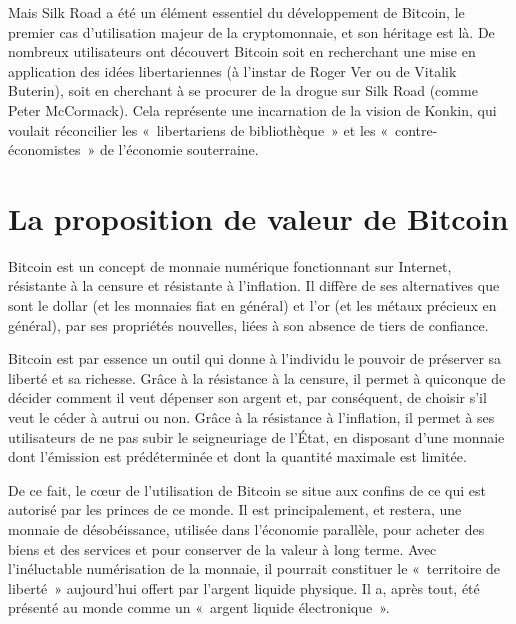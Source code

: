 Mais Silk Road a été un élément essentiel du développement de Bitcoin, le premier cas d'utilisation majeur de la cryptomonnaie, et son héritage est là. De nombreux utilisateurs ont découvert Bitcoin soit en recherchant une mise en application des idées libertariennes (à l'instar de Roger Ver ou de Vitalik Buterin), soit en cherchant à se procurer de la drogue sur Silk Road (comme Peter McCormack). Cela représente une incarnation de la vision de Konkin, qui voulait réconcilier les «~libertariens de bibliothèque~» et les «~contre-économistes~» de l'économie souterraine.

\section*{La proposition de valeur de Bitcoin}

Bitcoin est un concept de monnaie numérique fonctionnant sur Internet, résistante à la censure et résistante à l'inflation. Il diffère de ses alternatives que sont le dollar (et les monnaies fiat en général) et l'or (et les métaux précieux en général), par ses propriétés nouvelles, liées à son absence de tiers de confiance. 

Bitcoin est par essence un outil qui donne à l'individu le pouvoir de préserver sa liberté et sa richesse. Grâce à la résistance à la censure, il permet à quiconque de décider comment il veut dépenser son argent et, par conséquent, de choisir s'il veut le céder à autrui ou non. Grâce à la résistance à l'inflation, il permet à ses utilisateurs de ne pas subir le seigneuriage de l'État, en disposant d'une monnaie dont l'émission est prédéterminée et dont la quantité maximale est limitée.

De ce fait, le cœur de l'utilisation de Bitcoin se situe aux confins de ce qui est autorisé par les princes de ce monde. Il est principalement, et restera, une monnaie de désobéissance, utilisée dans l'économie parallèle, pour acheter des biens et des services et pour conserver de la valeur à long terme. Avec l'inéluctable numérisation de la monnaie, il pourrait constituer le «~territoire de liberté~» aujourd'hui offert par l'argent liquide physique. Il a, après tout, été présenté au monde comme un «~argent liquide électronique~».

\printendnotes